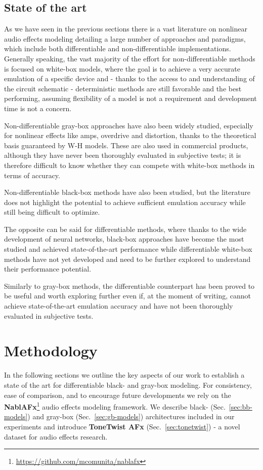 \subsection{State of the art}
\label{sec:back-sota}

As we have seen in the previous sections there is a vast literature on nonlinear audio effects modeling detailing a large number of approaches and paradigms, which include both differentiable and non-differentiable implementations.
Generally speaking, the vast majority of the effort for non-differentiable methods is focused on white-box models, where the goal is to achieve a very accurate emulation of a specific device and - thanks to the access to and understanding of the circuit schematic - deterministic methods are still favorable and the best performing, assuming flexibility of a model is not a requirement and development time is not a concern.

Non-differentiable gray-box approaches have also been widely studied, especially for nonlinear effects like amps, overdrive and distortion, thanks to the theoretical basis guaranteed by W-H models. These are also used in commercial products, although they have never been thoroughly evaluated in subjective tests; it is therefore difficult to know whether they can compete with white-box methods in terms of accuracy.

Non-differentiable black-box methods have also been studied, but the literature does not highlight the potential to achieve sufficient emulation accuracy while still being difficult to optimize.

The opposite can be said for differentiable methods, where thanks to the wide development of neural networks, black-box approaches have become the most studied and achieved state-of-the-art performance while differentiable white-box methods have not yet developed and need to be further explored to understand their performance potential.

Similarly to gray-box methods, the differentiable counterpart has been proved to be useful and worth exploring further even if, at the moment of writing, cannot achieve state-of-the-art emulation accuracy and have not been thoroughly evaluated in subjective tests.

\section{Methodology}
In the following sections we outline the key aspects of our work to establish a state of the art for differentiable black- and gray-box modeling. 
For consistency, ease of comparison, and to encourage future developments we rely on the \textbf{NablAFx}\footnote{\url{https://github.com/mcomunita/nablafx}}\citep{comunità2025nablafxframeworkdifferentiableblackbox} audio effects modeling framework.
We describe black- (Sec.~\ref{sec:bb-models}) and gray-box (Sec.~\ref{sec:gb-models}) architectures included in our experiments and introduce \textbf{ToneTwist AFx} (Sec.~\ref{sec:tonetwist}) - a novel dataset for audio effects research.

